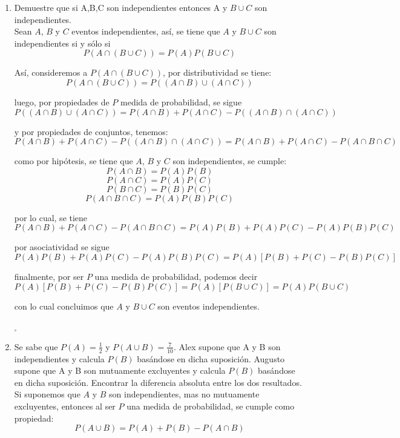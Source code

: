 \documentclass[12pt,a4paper]{report}
\begin{document}
\begin{enumerate}
   \item {
   Demuestre que si A,B,C son independientes entonces A y $B\cup C$ son independientes.\\
    Sean $A$, $B$ y  $C$ eventos independientes, así, se tiene que $A$ y $B \cup C$
	son independientes si y sólo si
		$$ P(A\cap(B \cup C)) = P(A)P(B \cup C) $$

	Así, consideremos a $ P(A\cap(B \cup C)) $, por distributividad
	se tiene:
		$$ P(A\cap(B \cup C)) = P((A \cap B) \cup (A \cap C)) $$

	luego, por propiedades de $P$ medida de probabilidad, se sigue
		$$ P((A \cap B) \cup (A \cap C)) = P(A \cap B) + P(A \cap C) - P((A \cap B) \cap (A \cap C)) $$

	y por propiedades de conjuntos, tenemos:
		$$ P(A \cap B) + P(A \cap C) - P((A \cap B) \cap (A \cap C)) = P(A \cap B) + P(A \cap C) - P(A \cap B \cap C) $$

	como por hipótesis, se tiene que $A$, $B$ y $C$ son independientes, se cumple:
		$$ P(A \cap B) = P(A)P(B) $$
		$$ P(A \cap C) = P(A)P(C) $$
		$$ P(B \cap C) = P(B)P(C) $$
		$$ P(A \cap B \cap C) = P(A)P(B)P(C) $$

	por lo cual, se tiene
		$$ P(A \cap B) + P(A \cap C) - P(A \cap B \cap C) = P(A)P(B) + P(A)P(C) - P(A)P(B)P(C) $$

	por asociatividad se sigue
		$$ P(A)P(B) + P(A)P(C) - P(A)P(B)P(C) = P(A)[P(B) + P(C) - P(B)P(C)] $$

	finalmente, por ser $P$ una medida de probabilidad, podemos decir
		$$ P(A)[P(B) + P(C) - P(B)P(C)] = P(A)[P(B \cup C)] = P(A)P(B \cup C) $$

	con lo cual concluimos que $A$ y $B \cup C$ son eventos independientes.

	\begin{flushright}
		$_{\square}$
	\end{flushright}

	}

   \item {
   Se sabe que $P(A)= \frac{1}{2}$ y $P(A\cup B)=\frac{7}{10}$. Alex supone que A y B son independientes y calcula $P(B)$ basándose en dicha suposición. Augusto supone que A y B son mutuamente excluyentes y calcula $P(B)$ basándose en dicha suposición. Encontrar la diferencia absoluta entre los dos resultados.\\

   		Si suponemos que $A$ y $B$ son independientes, mas no mutuamente excluyentes,
		entonces al ser $P$ una medida de probabilidad, se cumple como propiedad:
			$$ P(A \cup B) = P(A) + P(B) - P(A \cap B)$$

}
\end{enumerate}
\end{document}
